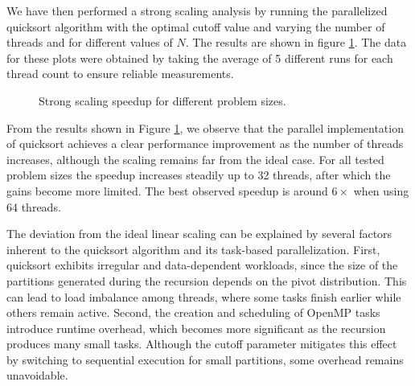 \documentclass[unicode,10pt,a4paper,oneside,numbers=endperiod,openany]{scrartcl}
\begin{document}
We have then performed a strong scaling analysis by running the parallelized quicksort algorithm with the optimal cutoff value and varying the number of threads and for different values of $N$. The results are shown in figure \ref{fig:quicksort_speedup}. The data for these plots were obtained by taking the average of 5 different runs for each thread count to ensure reliable measurements.
\begin{figure}[h]
\centering
{}
\caption{Strong scaling speedup for different problem sizes.}
\label{fig:quicksort_speedup}
\end{figure}

From the results shown in Figure \ref{fig:quicksort_speedup}, we observe that the parallel implementation of quicksort achieves a clear performance improvement as the number of threads increases, although the scaling remains far from the ideal case. For all tested problem sizes the speedup increases steadily up to 32 threads, after which the gains become more limited. The best observed speedup is around $6\times$ when using 64 threads.

The deviation from the ideal linear scaling can be explained by several factors inherent to the quicksort algorithm and its task-based parallelization. First, quicksort exhibits irregular and data-dependent workloads, since the size of the partitions generated during the recursion depends on the pivot distribution. This can lead to load imbalance among threads, where some tasks finish earlier while others remain active. Second, the creation and scheduling of OpenMP tasks introduce runtime overhead, which becomes more significant as the recursion produces many small tasks. Although the cutoff parameter mitigates this effect by switching to sequential execution for small partitions, some overhead remains unavoidable.
\end{document}
